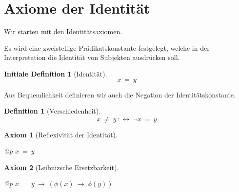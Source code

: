 \documentclass[a4paper,german,10pt,twoside]{book}
\newtheorem{ax}{Axiom}
\theoremstyle{definition}
\newtheorem{defn}[thm]{Definition}
\newtheorem{idefn}[thm]{Initiale Definition}
\theoremstyle{remark}
\begin{document}
\section{Axiome der Identit{\"a}t} \label{chapter6_section0} \hypertarget{chapter6_section0}{}
Wir starten mit den Identit{\"a}tsaxiomen.

\par
Es wird eine zweistellige Pr{\"a}dikatskonstante festgelegt, welche in der Interpretation die Identit{\"a}t von Subjekten ausdr{\"u}cken soll.

\begin{idefn}[Identit{\"a}t]
\label{definition:identity} \hypertarget{definition:identity}{}
$$x \ =  \ y$$

\end{idefn}




\par
Aus Bequemlichkeit definieren wir auch die Negation der Identit{\"a}tskonstante.

\begin{defn}[Verschiedenheit]
\label{definition:notEqual} \hypertarget{definition:notEqual}{}
$$x \ \neq \ y\ :\leftrightarrow \ \neg x \ =  \ y$$

\end{defn}




\par


\begin{ax}[Reflexivit{\"a}t der Identit{\"a}t]
\label{axiom:identityIsReflexive} \hypertarget{axiom:identityIsReflexive}{}
\mbox{}
\begin{longtable}{{@{\extracolsep{\fill}}p{\linewidth}}}
\centering $x \ =  \ y$
\end{longtable}

\end{ax}




\par


\begin{ax}[Leibnizsche Ersetzbarkeit]
\label{axiom:leibnizReplacement} \hypertarget{axiom:leibnizReplacement}{}
\mbox{}
\begin{longtable}{{@{\extracolsep{\fill}}p{\linewidth}}}
\centering $x \ =  \ y\ \rightarrow \ (\phi(x)\ \rightarrow \ \phi(y))$
\end{longtable}

\end{ax}
\end{document}
